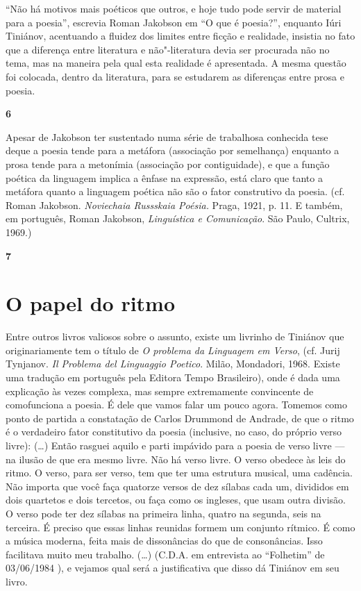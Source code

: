 ``Não há motivos mais poéticos que outros, e hoje tudo pode servir de
material para a poesia'', escrevia Roman Jakobson em ``O que é
poesia?'', enquanto Iúri Tiniánov, acentuando a fluidez dos limites
entre ficção e realidade, insistia no fato que a diferença entre
literatura e não"-literatura devia ser procurada não no tema, mas na
maneira pela qual esta realidade é apresentada. A mesma questão foi
colocada, dentro da literatura, para se estudarem as diferenças entre
prosa e poesia.

\textbf{6}

Apesar de Jakobson ter sustentado numa série de trabalhosa conhecida
tese deque a poesia tende para a metáfora (associação por semelhança)
enquanto a prosa tende para a metonímia (associação por contiguidade), e
que a função poética da linguagem implica a ênfase na expressão, está
claro que tanto a metáfora quanto a linguagem poética não são o fator
construtivo da poesia. (cf. Roman Jakobson. \emph{Noviechaia Russskaia
Poésia.} Praga, 1921, p. 11. E também, em português, Roman Jakobson,
\emph{Linguística e Comunicação}. São Paulo, Cultrix, 1969.)

\textbf{7 }

\section{O papel do ritmo}

Entre outros livros valiosos sobre o assunto, existe um livrinho de
Tiniánov que originariamente tem o título de \emph{O problema da
Linguagem em Verso}, (cf. Jurij Tynjanov. \emph{Il Problema del
Linguaggio Poetico}. Milão, Mondadori, 1968. Existe uma tradução em
português pela Editora Tempo Brasileiro), onde é dada uma explicação às
vezes complexa, mas sempre extremamente convincente de comofunciona a
poesia. É dele que vamos falar um pouco agora. Tomemos como ponto de
partida a constatação de Carlos Drummond de Andrade, de que o ritmo é o
verdadeiro fator constitutivo da poesia (inclusive, no caso, do próprio
verso livre): (\ldots{}) Então rasguei aquilo e parti impávido para a poesia
de verso livre --- na ilusão de que era mesmo livre. Não há verso livre.
O verso obedece às leis do ritmo. O verso, para ser verso, tem que ter
uma estrutura musical, uma cadência. Não importa que você faça quatorze
versos de dez sílabas cada um, divididos em dois quartetos e dois
tercetos, ou faça como os ingleses, que usam outra divisão. O verso pode
ter dez sílabas na primeira linha, quatro na segunda, seis na terceira.
É preciso que essas linhas reunidas formem um conjunto rítmico. É como a
música moderna, feita mais de dissonâncias do que de consonâncias. Isso
facilitava muito meu trabalho. (\ldots{}) (C.D.A. em entrevista ao
``Folhetim'' de 03/06/1984 ), e vejamos qual será a justificativa que
disso dá Tiniánov em seu livro.

